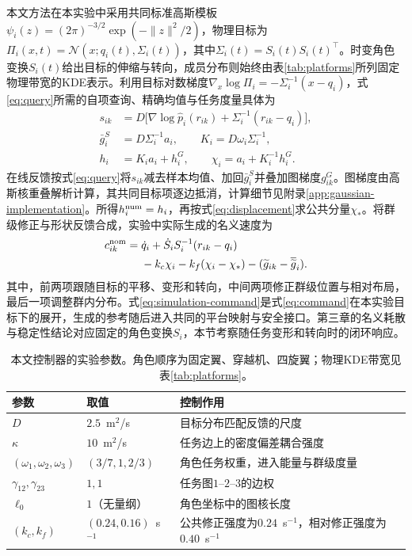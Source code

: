 \documentclass[UTF8,a4paper,11pt,fontset=none]{ctexart}
\begin{document}
本文方法在本实验中采用共同标准高斯模板$\psi_i(z)=(2\pi)^{-3/2}\exp(-\|z\|^2/2)$，物理目标为$\Pi_i(x,t)=\mathcal N(x;q_i(t),\Sigma_i(t))$，其中$\Sigma_i(t)=S_i(t)S_i(t)^\top$。时变角色变换$S_i(t)$给出目标的伸缩与转向，成员分布则始终由表\ref{tab:platforms}所列固定物理带宽的KDE表示。利用目标对数梯度$\nabla_x\log\Pi_i=-\Sigma_i^{-1}(x-q_i)$，式\eqref{eq:query}所需的自项查询、精确均值与任务度量具体为
\begin{equation}
\begin{aligned}
s_{ik}&=D\big[\nabla\log\widehat p_i(r_{ik})+\Sigma_i^{-1}(r_{ik}-q_i)\big],\\
\bar g_i^S&=D\Sigma_i^{-1}a_i,\qquad K_i=D\omega_i\Sigma_i^{-1},\\
h_i&=K_i a_i+h_i^G,\qquad \chi_i=a_i+K_i^{-1}h_i^G .
\end{aligned}
\label{eq:exact-mean}
\end{equation}
在线反馈按式\eqref{eq:query}将$s_{ik}$减去样本均值、加回$\bar g_i^S$并叠加图梯度$g^G_{ik}$。图梯度由高斯核重叠解析计算，其共同目标项逐边抵消，计算细节见附录\ref{app:gaussian-implementation}。所得$h_i^{\rm num}=h_i$，再按式\eqref{eq:displacement}求公共分量$\chi_*$。将群级修正与形状反馈合成，实验中实际生成的名义速度为
\begin{equation}
\begin{aligned}
c^{\rm nom}_{ik}={}&\dot q_i+\dot S_iS_i^{-1}(r_{ik}-q_i)\\
&-k_c\chi_i-k_f(\chi_i-\chi_*)
-(\widetilde g_{ik}-\overline{\widetilde g}_i).
\end{aligned}
\label{eq:simulation-command}
\end{equation}
其中，前两项跟随目标的平移、变形和转向，中间两项修正群级位置与相对布局，最后一项调整群内分布。式\eqref{eq:simulation-command}是式\eqref{eq:command}在本实验目标下的展开，生成的参考随后进入共同的平台映射与安全接口。第三章的名义耗散与稳定性结论对应固定的角色变换$S_i$，本节考察随任务变形和转向时的闭环响应。

\begin{table}[htbp]\centering\small
\caption{本文控制器的实验参数。角色顺序为固定翼、穿越机、四旋翼；物理KDE带宽见表\ref{tab:platforms}。}\label{tab:controller-parameters}
\begin{tabular}{p{34mm}p{37mm}p{82mm}}\toprule
参数 & 取值 & 控制作用\\\midrule
$D$ & $2.5$~m$^2$/s & 目标分布匹配反馈的尺度\\
$\kappa$ & $10$~m$^2$/s & 任务边上的密度偏差耦合强度\\
$(\omega_1,\omega_2,\omega_3)$ & $(3/7,1,2/3)$ & 角色任务权重，进入能量与群级度量\\
$\gamma_{12},\gamma_{23}$ & $1,1$ & 任务图$1$--$2$--$3$的边权\\
$\ell_0$ & $1$（无量纲） & 角色坐标中的图核长度\\
$(k_c,k_f)$ & $(0.24,0.16)$~s$^{-1}$ & 公共修正强度为$0.24$~s$^{-1}$，相对修正强度为$0.40$~s$^{-1}$\\\bottomrule
\end{tabular}\end{table}
\end{document}
